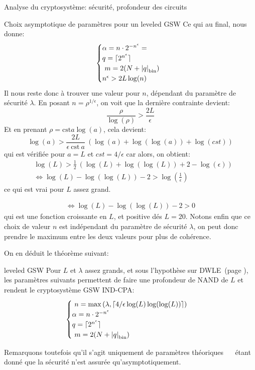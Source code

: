 \begin{section}{Analyse du cryptosystème: sécurité, profondeur des circuits}
\begin{subsection}{Choix asymptotique de paramètres pour un leveled GSW}
Ce qui au final, nous donne:
\[ \begin{cases}
	\alpha  = n \cdot 2^{-n^\epsilon}=  \\
	q = \lceil 2^{n^\epsilon} \rceil\\ 
	m = 2(N + \bnorm{q}) \\  
	n^\epsilon > 2 L \log(n)
	\end{cases}  \]
Il nous reste donc à trouver une valeur pour $n$, dépendant du paramètre de sécurité $\lambda$.  En posant $n = \rho^{1/\epsilon}$, on voit que la dernière contrainte devient:
\[ \frac{\rho}{\log(\rho)} > \frac{2 L}{\epsilon}  \]
Et en prenant $\rho = \text{cst} a \log(a)$, cela devient:
\[\log(a)> \frac{2 L}{\epsilon\:\text{cst}\: a}\:(\log(a) + \log(\log(a)) + \log(cst))   \]
qui est vérifiée pour $a = L$ et $cst = 4/\epsilon$ car alors, on obtient:
\begin{align*}
& \log(L)> \frac{1}{\text{2}}\:(\log(L) + \log(\log(L)) + 2 - \log(\epsilon)) \\
&\Leftrightarrow  \log(L) - \log(\log(L)) - 2 > \log(\frac{1}{\epsilon})
\end{align*}
ce qui est vrai pour $L$ assez grand.  

\begin{align*}
\Leftrightarrow  \log(L) - \log(\log(L)) - 2 > 0
\end{align*}
	qui est une fonction croissante en $L$, et positive dés $L = 20$.  Notons enfin que ce choix de valeur $n$ est indépendant du paramètre de sécurité $\lambda$, on peut donc prendre le maximum entre les deux valeurs pour plus de cohérence.  

On en déduit le théorème suivant:
\begin{thm}{leveled GSW}
	Pour $L$ et $\lambda$ assez grands, et sous l'hypothèse sur DWLE~(page \pageref{hyp_dwle}), les paramètres suivants permettent de faire une profondeur de NAND de $L$
et rendent le cryptosystème GSW IND-CPA:
\[ \begin{cases} 
	n = \max\left(\lambda, \lceil 4/\epsilon \log(L) \log(\log(L))
	\rceil\right)  \\
	\alpha  = n \cdot 2^{-n^\epsilon}  \\
	q = \lceil 2^{n^\epsilon} \rceil\\ 
	m = 2(N + \bnorm{q}) \\  
	\end{cases}  \]
\end{thm}
Remarquons toutefois qu'il s'agit uniquement de paramètres \og théoriques \fg~ \ étant donné que la sécurité n'est assurée qu'asymptotiquement.



\end{subsection}
\end{section}
